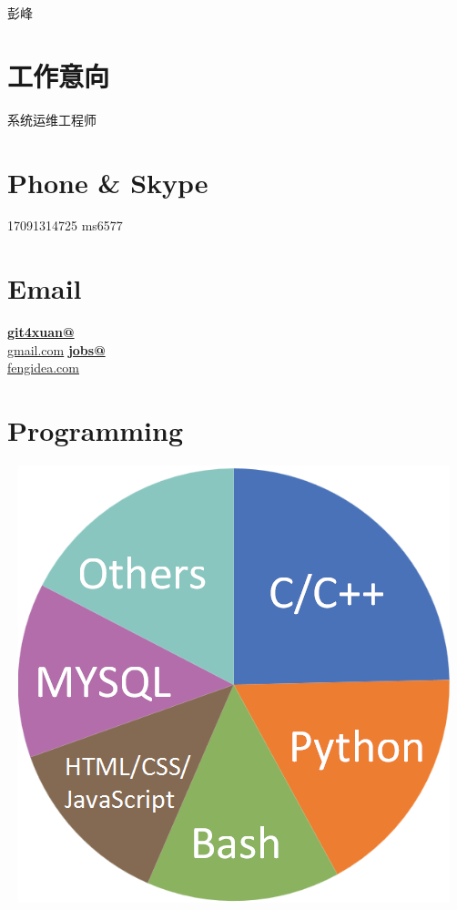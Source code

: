 \documentclass[]{friggeri-cv}
\begin{document}
      { 彭峰 } 
      



\begin{aside}
  \section{工作意向}
    系统运维工程师
    ~
  \section{Phone \& Skype}
    17091314725
    ms6577
    ~
  \section{Email}
    \href{mailto:git4xuan@gmail.com}{\textbf{git4xuan@}\\gmail.com}
    \href{mailto:jobs@fengidea.com}{\textbf{jobs@}\\fengidea.com}
    ~
    ~
  \section{Programming}
  ~
    \includegraphics[scale=0.25]{img/programming2.png}
    ~

\end{aside}
\end{document}
